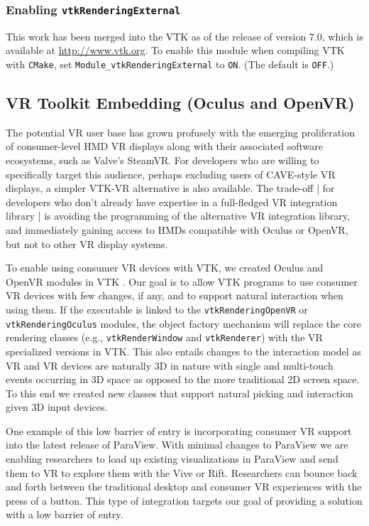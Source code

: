 \subsubsection{Enabling \texttt{vtkRenderingExternal}}

This work has been merged into the VTK as of the release of version 7.0, which is available at
\url{http://www.vtk.org}.
To enable this module when compiling VTK with \texttt{CMake},
set \texttt{Module\_vtkRenderingExternal} to \texttt{ON}. (The default is \texttt{OFF}.)

\subsection{VR Toolkit Embedding (Oculus and OpenVR)}

The potential VR user base has grown profusely with the emerging
proliferation of consumer-level HMD VR displays along with their associated
software ecosystems, such as Valve's SteamVR.
For developers who are willing to specifically target this audience, perhaps
excluding users of CAVE-style VR displays, a simpler VTK-VR alternative is
also available.
The trade-off | for developers who don't already have expertise in a
full-fledged VR integration library | is avoiding the programming of
the alternative VR integration library, and immediately gaining access
to HMDs compatible with Oculus or OpenVR, but not to other VR display systems.

To enable using consumer VR devices with VTK, we created Oculus and OpenVR modules in VTK .
Our goal is to allow VTK programs to use consumer VR devices with few changes, if any, and to support natural interaction when using them.
If the executable is linked to the \texttt{vtkRenderingOpenVR} or \texttt{vtkRenderingOculus} modules, the object factory
mechanism will replace the core rendering classes (e.g.,
\texttt{vtkRenderWindow} and \texttt{vtkRenderer}) with the VR specialized versions in VTK.  This also entails changes to the 
interaction model as VR and VR devices are naturally 3D in nature with single and multi-touch events occurring in 3D space as 
opposed to the more traditional 2D screen space. To this end we created new classes that support natural picking and interaction given 3D 
input devices.

One example of this low barrier of entry is incorporating consumer VR support into the latest release of ParaView. With minimal changes to ParaView we are enabling researchers to load up existing visualizations in ParaView and send them to VR to explore them with the Vive or Rift. Researchers can bounce back and forth between the traditional desktop and consumer VR experiences with the press of a button. This type of integration targets our goal of providing a solution with a low barrier of entry.


